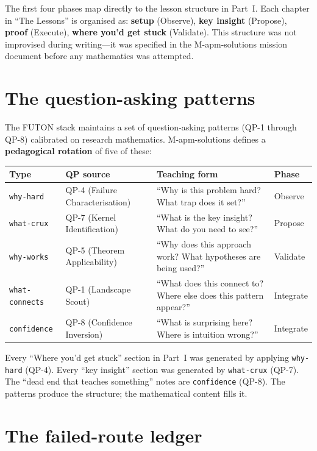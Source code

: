 \documentclass[12pt,oneside]{book}
\theoremstyle{plain}
\theoremstyle{definition}
\theoremstyle{remark}
\begin{document}
The first four phases map directly to the lesson structure in Part~I.
Each chapter in ``The Lessons'' is organised as:
\textbf{setup} (Observe), \textbf{key insight} (Propose),
\textbf{proof} (Execute), \textbf{where you'd get stuck} (Validate).
This structure was not improvised during writing---it was specified in
the M-apm-solutions mission document before any mathematics was attempted.

\section{The question-asking patterns}

The FUTON stack maintains a set of question-asking patterns (QP-1 through
QP-8) calibrated on research mathematics. M-apm-solutions defines a
\textbf{pedagogical rotation} of five of these:

\begin{center}
\begin{tabular}{lp{4cm}p{5cm}l}
\toprule
\textbf{Type} & \textbf{QP source} & \textbf{Teaching form} & \textbf{Phase} \\
\midrule
\texttt{why-hard} & QP-4 (Failure Characterisation) &
  ``Why is this problem hard? What trap does it set?'' & Observe \\
\texttt{what-crux} & QP-7 (Kernel Identification) &
  ``What is the key insight? What do you need to see?'' & Propose \\
\texttt{why-works} & QP-5 (Theorem Applicability) &
  ``Why does this approach work? What hypotheses are being used?'' & Validate \\
\texttt{what-connects} & QP-1 (Landscape Scout) &
  ``What does this connect to? Where else does this pattern appear?'' & Integrate \\
\texttt{confidence} & QP-8 (Confidence Inversion) &
  ``What is surprising here? Where is intuition wrong?'' & Integrate \\
\bottomrule
\end{tabular}
\end{center}

Every ``Where you'd get stuck'' section in Part~I was generated by
applying \texttt{why-hard} (QP-4). Every ``key insight'' section was
generated by \texttt{what-crux} (QP-7). The ``dead end that teaches
something'' notes are \texttt{confidence} (QP-8). The patterns produce
the structure; the mathematical content fills it.

\section{The failed-route ledger}
\end{document}
